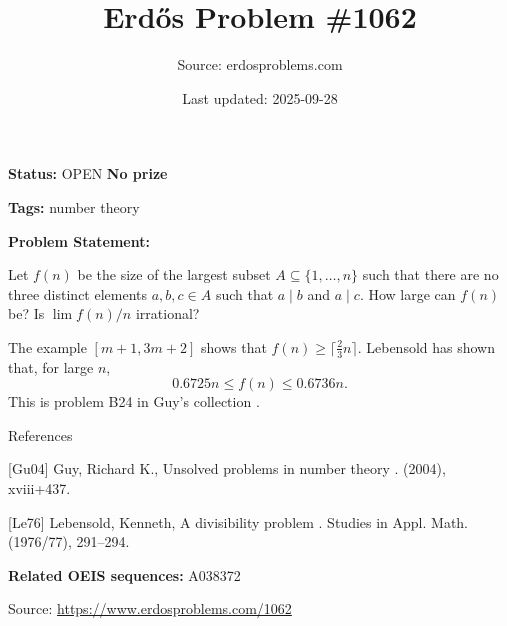 \documentclass{article}
\title{Erd\H{o}s Problem \#1062}
\date{Last updated: 2025-09-28}
\author{Source: erdosproblems.com}
\begin{document}
\maketitle

\noindent\textbf{Status:} OPEN \quad \textbf{No prize}

\noindent\textbf{Tags:} number theory

\medskip

\noindent\textbf{Problem Statement:}

Let $f(n)$ be the size of the largest subset $A\subseteq \{1,\ldots,n\}$ such that there are no three distinct elements $a,b,c\in A$ such that $a\mid b$ and $a\mid c$. How large can $f(n)$ be? Is $\lim f(n)/n$ irrational?




The example $[m+1,3m+2]$ shows that $f(n)\geq\lceil \frac{2}{3}n\rceil$. Lebensold \cite{Le76} has shown that, for large $n$,\[0.6725 n \leq f(n) \leq 0.6736 n.\]This is problem B24 in Guy's collection \cite{Gu04}.




References

[Gu04] Guy, Richard K., Unsolved problems in number theory . (2004), xviii+437.

[Le76] Lebensold, Kenneth, A divisibility problem . Studies in Appl. Math. (1976/77), 291--294.

\noindent\textbf{Related OEIS sequences:} A038372


\bigskip
\noindent\small{Source: \url{https://www.erdosproblems.com/1062}}
\end{document}
